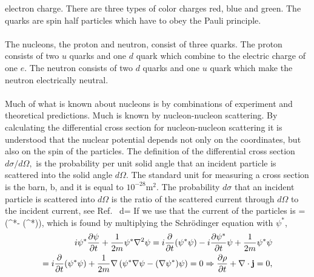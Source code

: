 electron charge.  There are three types of color charges red, blue and
green. The quarks are spin half particles which have to obey the Pauli principle.\\
\\
The nucleons, the proton and neutron, consist of three quarks. The proton
consists of two $u$ quarks and one $d$ quark which combine to the electric
charge of one $e$. The neutron consists of two $d$ quarks and one $u$ quark
which make the neutron electrically neutral.\\
\\
Much of what is known about nucleons is by combinations of experiment and 
theoretical predictions. Much is known by nucleon-nucleon scattering. 
By calculating the differential cross section for nucleon-nucleon 
scattering it is understood that the nuclear potential depends not only on 
the coordinates, but also on the spin of the particles.
The definition of the differential cross section $d\sigma/d\Omega,$ is the probability per unit solid angle that an incident particle is scattered into the
solid angle $d\Omega.$ The standard unit for measuring a cross section is the barn, b, and it is equal to $10^{-28}$m$^2$. The probability $d\sigma$ that an incident particle is 
scattered into $d\Omega$ is the ratio of the scattered current through $d\Omega$
to the incident current, see Ref.~\cite{kraneintro}
\be
d\sigma = 
\label{Eq:crossec}
\ee
If we use that the current of the particles is
\be
{}= (\psi^*\nabla \psi- (\nabla\psi^*)\psi),
\ee
which is found by multiplying the Schr\"odinger equation with $\psi^*$,
\begin{equation*}
		\begin{split}
		i\psi^*\frac{\partial\psi}{\partial t}+\frac{1}{2m}
		\psi^*\nabla^2 \psi= i\frac{\partial}{\partial t}(\psi^*\psi)
		-i\frac{\partial \psi^*}{\partial t}\psi+\frac{1}{2m}\psi^*\psi\\
		=i\frac{\partial}{\partial t}(\psi^*\psi)+\frac{1}{2m}\nabla\left(\psi^*\nabla\psi-(\nabla\psi^*)\psi\right)=0\Rightarrow \frac{\partial \rho}{\partial t}+\bold{\nabla}\cdot \bold{j}=0,
\end{split}
\end{equation*}
